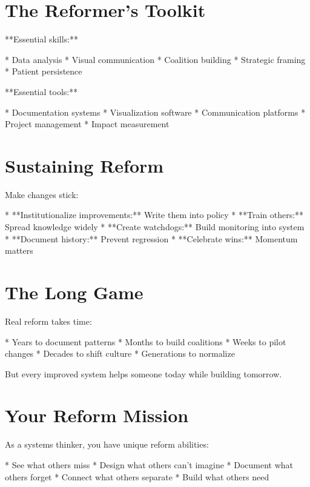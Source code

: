 \documentclass[12pt,oneside]{book}
\begin{document}
\section{The Reformer's Toolkit}

**Essential skills:**

                    * Data analysis
                    * Visual communication
                    * Coalition building
                    * Strategic framing
                    * Patient persistence

**Essential tools:**

                    * Documentation systems
                    * Visualization software
                    * Communication platforms
                    * Project management
                    * Impact measurement

\section{Sustaining Reform}

Make changes stick:

                    * **Institutionalize improvements:** Write them into policy
                    * **Train others:** Spread knowledge widely
                    * **Create watchdogs:** Build monitoring into system
                    * **Document history:** Prevent regression
                    * **Celebrate wins:** Momentum matters

\section{The Long Game}

Real reform takes time:

                    * Years to document patterns
                    * Months to build coalitions
                    * Weeks to pilot changes
                    * Decades to shift culture
                    * Generations to normalize

But every improved system helps someone today while building tomorrow.

\section{Your Reform Mission}

As a systems thinker, you have unique reform abilities:

                    * See what others miss
                    * Design what others can't imagine
                    * Document what others forget
                    * Connect what others separate
                    * Build what others need
\end{document}
